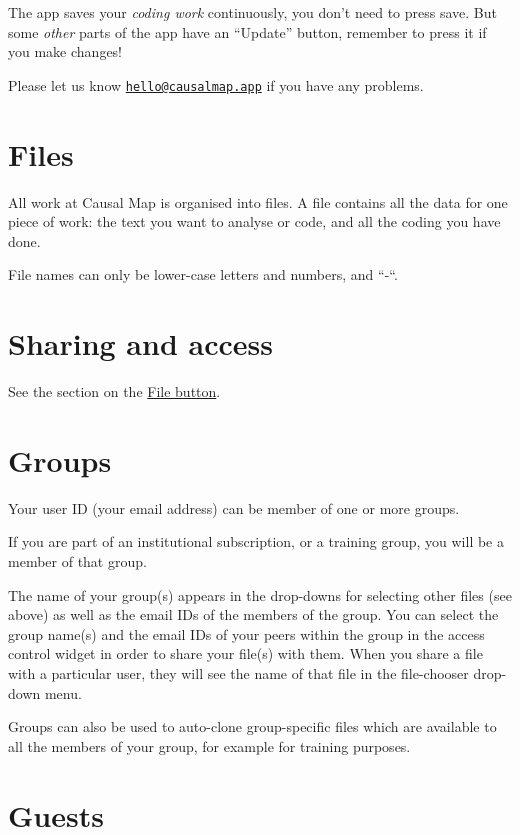 \documentclass[
]{book}
\begin{document}
The app saves your \emph{coding work} continuously, you don't need to press save. But some \emph{other} parts of the app have an ``Update'' button, remember to press it if you make changes!

Please let us know \href{mailto:hello@causalmap.app}{\nolinkurl{hello@causalmap.app}} if you have any problems.

\hypertarget{files}{%
\section{Files}\label{files}}

All work at Causal Map is organised into files. A file contains all the data for one piece of work: the text you want to analyse or code, and all the coding you have done.

File names can only be lower-case letters and numbers, and ``-``.

\hypertarget{sharing-and-access}{%
\section{Sharing and access}\label{sharing-and-access}}

See the section on the \protect\hyperlink{sharing}{File button}.

\hypertarget{groups}{%
\section{Groups}\label{groups}}

Your user ID (your email address) can be member of one or more groups.

If you are part of an institutional subscription, or a training group, you will be a member of that group.

The name of your group(s) appears in the drop-downs for selecting other files (see above) as well as the email IDs of the members of the group. You can select the group name(s) and the email IDs of your peers within the group in the access control widget in order to share your file(s) with them. When you share a file with a particular user, they will see the name of that file in the file-chooser drop-down menu.

Groups can also be used to auto-clone group-specific files which are available to all the members of your group, for example for training purposes.

\hypertarget{guests}{%
\section{Guests}\label{guests}}
\end{document}
